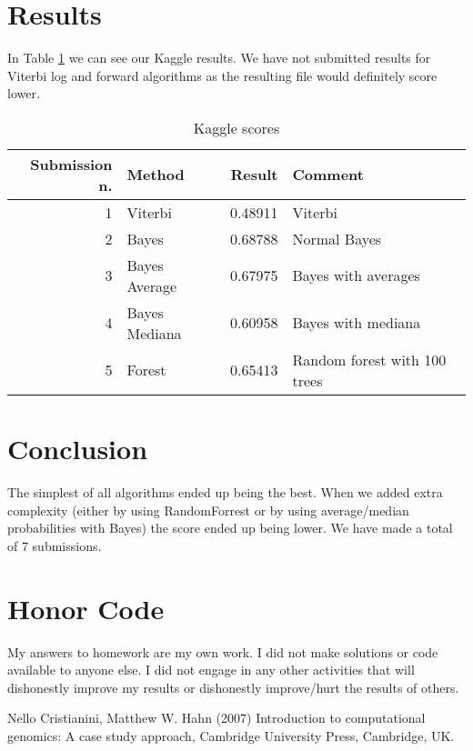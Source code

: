 \documentclass[a4paper,11pt]{article}
\begin{document}
\section{Results}

In Table \ref{scores} we can see our Kaggle results. We have not submitted results for Viterbi log and forward algorithms as the resulting file would definitely score lower.

\begin{table}[htbp,resetmargins=true]
\caption{Kaggle scores}
\label{scores}
\begin{center}
\begin{tabular}{@{}rlrl@{}}

Submission n. & Method & Result & Comment \\
\hline

1 & Viterbi & 0.48911 & Viterbi \\
2 & Bayes & 0.68788& Normal Bayes \\
3 & Bayes Average & 0.67975 & Bayes with averages \\
4 & Bayes Mediana & 0.60958 & Bayes with mediana \\
5 & Forest &  0.65413 & Random forest with 100 trees \\

\end{tabular}
\end{center}
\end{table}

\section{Conclusion}

The simplest of all algorithms ended up being the best. When we added extra complexity (either by using RandomForrest or by using average/median probabilities with Bayes) the score ended up being lower. We have made a total of 7 submissions.

\section*{Honor Code}


My answers to homework are my own work. I did not make solutions or code available to anyone else. I did not engage in any other activities that will dishonestly improve my results or dishonestly improve/hurt the results of others.


\begin{thebibliography}{1}
Nello Cristianini, Matthew W. Hahn (2007) Introduction to computational genomics: A case study approach, Cambridge University Press, Cambridge, UK.


\end{thebibliography}
\end{document}

